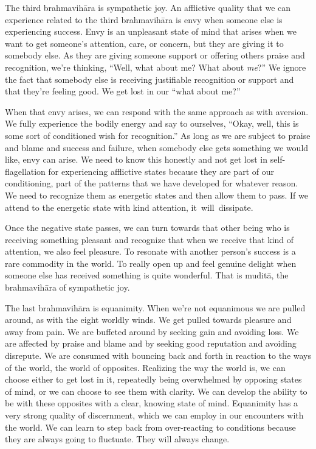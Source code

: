 The third brahmavihāra is sympathetic joy. An afflictive quality that we can experience related to the third brahmavihāra is envy when someone else is experiencing success. Envy is an unpleasant state of mind that arises when we want to get someone's attention, care, or concern, but they are giving it to somebody else. As they are giving someone support or offering others praise and recognition, we're thinking, ``Well, what about me? What about \emph{me}?'' We ignore the fact that somebody else is receiving justifiable recognition or support and that they're feeling good. We get lost in our ``what about me?''

When that envy arises, we can respond with the same approach as with aversion. We fully experience the bodily energy and say to ourselves, ``Okay, well, this is some sort of conditioned wish for recognition.'' As long as we are subject to praise and blame and success and failure, when somebody else gets something we would like, envy can arise. We need to know this honestly and not get lost in self-flagellation for experiencing afflictive states because they are part of our conditioning, part of the patterns that we have developed for whatever reason. We need to recognize them as energetic states and then allow them to pass. If we attend to the energetic state with kind attention, \mbox{it will dissipate.}

Once the negative state passes, we can turn towards that other being who is receiving something pleasant and recognize that when we receive that kind of attention, we also feel pleasure. To resonate with another person's success is a rare commodity in the world. To really open up and feel genuine delight when someone else has received something is quite wonderful. That is muditā, the brahmavihāra of sympathetic joy.

The last brahmavihāra is equanimity. When we're not equanimous we are pulled around, as with the eight worldly winds. We get pulled towards pleasure and away from pain. We are buffeted around by seeking gain and avoiding loss. We are affected by praise and blame and by seeking good reputation and avoiding disrepute. We are consumed with bouncing back and forth in reaction to the ways of the world, the world of opposites. Realizing the way the world is, we can choose either to get lost in it, repeatedly being overwhelmed by opposing states of mind, or we can choose to see them with clarity. We can develop the ability to be with these opposites with a clear, knowing state of mind. Equanimity has a very strong quality of discernment, which we can employ in our encounters with the world. We can learn to step back from over-reacting to conditions because they are always going to fluctuate. They will always change.

